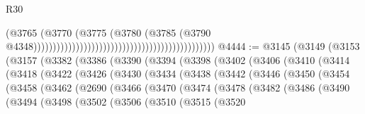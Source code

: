 \begin{lexlean}{R30}
\begin{coremodule}
                                                                                      (@3765
                                                                                        (@3770
                                                                                          (@3775
                                                                                            (@3780
                                                                                              (@3785
                                                                                                (@3790
                                                                                                  @4348)))))))))))))))))))))))))))))))))))))))))))))))
@4444 := @3145
    (@3149
      (@3153
        (@3157
          (@3382
            (@3386
              (@3390
                (@3394
                  (@3398
                    (@3402
                      (@3406
                        (@3410
                          (@3414
                            (@3418
                              (@3422
                                (@3426
                                  (@3430
                                    (@3434
                                      (@3438
                                        (@3442
                                          (@3446
                                            (@3450
                                              (@3454
                                                (@3458
                                                  (@3462
                                                    (@2690
                                                      (@3466
                                                        (@3470
                                                          (@3474
                                                            (@3478
                                                              (@3482
                                                                (@3486
                                                                  (@3490
                                                                    (@3494
                                                                      (@3498
                                                                        (@3502
                                                                          (@3506
                                                                            (@3510
                                                                              (@3515
                                                                                (@3520

\end{coremodule}
\end{lexlean}
